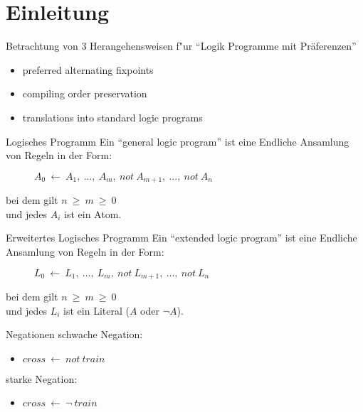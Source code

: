 \section{Einleitung}

\begin{frame}
  Betrachtung von 3 Herangehensweisen f"ur ``Logik Programme mit Präferenzen''
  \begin{itemize}
    \item preferred alternating fixpoints
    \item compiling order preservation
    \item translations into standard logic programs
  \end{itemize}
\end{frame}


\begin{frame}{Logisches Programm}
  Ein ``general logic program'' ist eine Endliche Ansamlung von Regeln in der Form:
  \begin{figure}
    \begin{math}
      A_0~\leftarrow~A_1,~...,~A_m,~not~A_{m+1},~...,~not~A_n
    \end{math}
  \end{figure}
  bei dem gilt $n~\geq~m~\geq~0$\\[0.5cm]
  und jedes $A_i$ ist ein Atom.
\end{frame}


\begin{frame}{Erweitertes Logisches Programm}
  Ein ``extended logic program'' ist eine Endliche Ansamlung von Regeln in der Form:
  \begin{figure}
    \begin{math}
      L_0~\leftarrow~L_1,~...,~L_m,~not~L_{m+1},~...,~not~L_n
    \end{math}
  \end{figure}
  bei dem gilt $n~\geq~m~\geq~0$\\[0.5cm]
  und jedes $L_i$ ist ein Literal ($A$ oder $\neg A$).
\end{frame}


\begin{frame}{Negationen}
  schwache Negation:
  \begin{itemize}
    \item $cross~\leftarrow~not~train$
  \end{itemize}
  starke Negation:
  \begin{itemize}
    \item $cross~\leftarrow~\neg~train$
  \end{itemize}
\end{frame}


